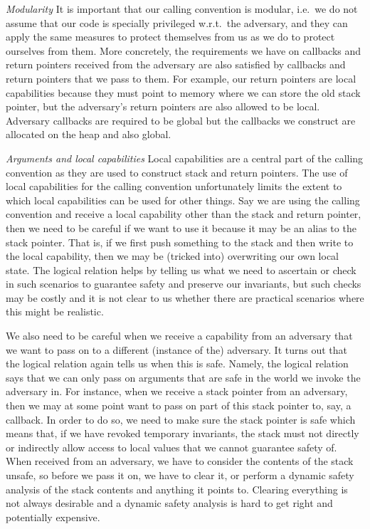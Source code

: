 \documentclass[format=acmsmall, review=true, screen=true]{acmart}
\begin{document}
\emph{Modularity} It is important that our calling convention is modular, i.e.\
we do not assume that our code is specially privileged w.r.t.\ the adversary,
and they can apply the same measures to protect themselves from us as we do to
protect ourselves from them. More concretely, the requirements we have on
callbacks and return pointers received from the adversary are also satisfied by
callbacks and return pointers that we pass to them. For example, our return
pointers are local capabilities because they must point to memory where we can
store the old stack pointer, but the adversary's return pointers are also
allowed to be local. Adversary callbacks are required to be global but the
callbacks we construct are allocated on the heap and also global.

\emph{Arguments and local capabilities} 
Local capabilities are a central part of the calling convention as they are used
to construct stack and return pointers. The use of local capabilities for the
calling convention unfortunately limits the extent to which local capabilities
can be used for other things. Say we are using the calling convention and
receive a local capability other than the stack and return pointer, then we need
to be careful if we want to use it because it may be an alias to the stack
pointer. That is, if we first push something to the stack and then write to the
local capability, then we may be (tricked into) overwriting our own local state.
The logical relation helps by telling us what we need to ascertain or check in
such scenarios to guarantee safety and preserve our invariants, but such checks
may be costly and it is not clear to us whether there are practical scenarios
where this might be realistic.

We also need to be careful when we receive a capability from an adversary that
we want to pass on to a different (instance of the) adversary. It turns out that
the logical relation again tells us when this is safe. Namely, the logical
relation says that we can only pass on arguments that are safe in the world we
invoke the adversary in. For instance, when we receive a stack pointer from an
adversary, then we may at some point want to pass on part of this stack pointer
to, say, a callback. In order to do so, we need to make sure the stack pointer
is safe which means that, if we have revoked temporary invariants, the stack
must not directly or indirectly allow access to local values that we cannot
guarantee safety of. When received from an adversary, we have to consider the
contents of the stack unsafe, so before we pass it on, we have to clear it, or
perform a dynamic safety analysis of the stack contents and anything it points
to. Clearing everything is not always desirable and a dynamic safety analysis is
hard to get right and potentially expensive.
\end{document}
